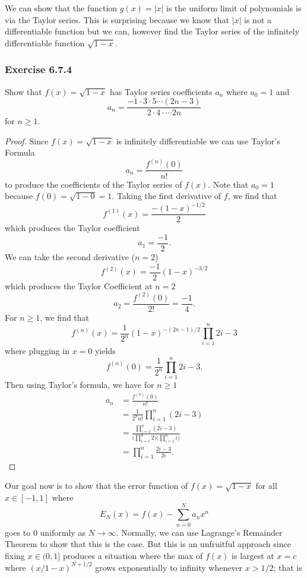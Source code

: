 We can show that the function \( g(x) = | x |  \) is the uniform limit of polynomials is via the Taylor series. This is surprising because we know that \( | x  |   \) is not a differentiable function but we can, however find the Taylor series of the infinitely differentiable function \( \sqrt{ 1 - x  }.  \)

\subsubsection{Exercise 6.7.4} Show that \( f(x) = \sqrt{ 1 - x  }  \) has Taylor series coefficients \( a_{n} \) where \( a_{0} = 1  \) and 
\[  a_{n} = \frac{  -1 \cdot 3 \cdot 5 \dotsb (2n-3)  }{ 2 \cdot 4 \cdot \dotsb 2n }  \] for \( n \geq 1  \).
\begin{proof}
Since \( f(x) = \sqrt{ 1 - x  }    \) is infinitely differentiable we can use Taylor's Formula 
\[  a_n = \frac{ f^{(n)}(0)  }{ n!  }  \] to produce the coefficients of the Taylor series of \( f(x)  \). Note that \( a_0 = 1  \) because \( f(0) = \sqrt{ 1 - 0  } = 1   \). Taking the first derivative of \( f \), we find that 
\[  f^{(1)}(x) = \frac{ -(1-x)^{-1/2} }{ 2 } \]
which produces the Taylor coefficient 
\[  a_1 = \frac{ -1 }{ 2 }. \] We can take the second derivative (\( n=2 \)) 
\[  f^{(2)}(x) = \frac{ -1 }{ 2 } (1-x)^{-3/2}  \] which produces the Taylor Coefficient at \( n =2  \) 
\[  a_2 = \frac{ f^{(2)}(0)  }{ 2!  } = \frac{ -1  }{ 4 }. \]
For \( n \geq 1  \), we find that 
\[  f^{(n)}(x) = \frac{ 1 }{ 2^{n} } (1-x)^{-(2n-1)/2 } \prod_{i=1}^{n} 2i-3  \]
where plugging in \( x = 0  \) yields 
\[  f^{(n)}(0) = \frac{ 1 }{ 2^{n} } \prod_{i=1}^{n} 2i -3. \]
Then using Taylor's formula, we have for \( n \geq 1  \) 
\begin{align*}
    a_n &= \frac{ f^{(n)}(0) }{ n! }  \\
        &= \frac{ 1 }{ 2^{n}n! } \prod_{i=1}^{n} (2i-3) \\
        &= \frac{ \prod_{i=1}^{n} (2i-3)}{ \Big( \prod_{i=1}^{n} 2 \Big) \Big( \prod_{i=1}^{n} i \Big)  }   \\
        &=  \prod_{i=1}^{n } \frac{ 2i-3 }{ 2i }  .
\end{align*}
\end{proof} 
Our goal now is to show that the error function of \( f(x) = \sqrt{ 1 - x  }  \) for all \( x \in [-1,1] \) where 
\[ E_{N}(x) = f(x) - \sum_{ n=0  }^{ N  } a_{n} x^{n} \]
goes to \( 0  \) uniformly as \( N \to \infty  \). Normally, we can use Lagrange's Remainder Theorem to show that this is the case. But this is an unfruitful approach since fixing \( x \in (0,1]  \) produces a situation where the max of \( f(x)  \) is largest at \( x = c  \) where \( (x / 1 - x)^{N + 1 /2 } \) grows exponentially to infinity whenever \( x > 1 / 2  \); that is 

